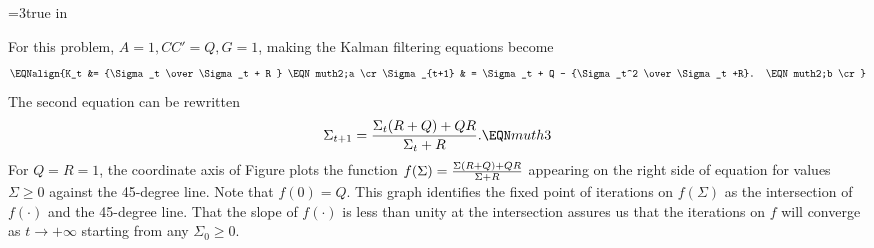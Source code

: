 
\centerline{\epsfxsize=3true in}
\caption{Graph of $f(\Sigma) = {
 {\Sigma(R+Q) + Q R} \over \Sigma + R }$, $Q= R=1$, against the 45-degree
line. Iterations on the Riccati equation for $\Sigma_t$ converge
to the fixed point.}
\endfigure





  For this problem,  $A=1, CC'=Q, G=1$, making the Kalman filtering
 equations  become
$$\EQNalign{K_t &= {\Sigma_t   \over \Sigma_t + R } \EQN muth2;a \cr
            \Sigma_{t+1} & = \Sigma_t + Q - {\Sigma_t^2 \over
                            \Sigma_t +R}. \EQN muth2;b \cr }$$
The second equation can be rewritten
$$ \Sigma_{t+1} = { \Sigma_t(R+Q) + Q R \over \Sigma_t + R }. \EQN muth3$$
For $Q=R=1$, the coordinate axis of Figure  plots the function
$f(\Sigma)
 = {\Sigma(R+Q) + Q R \over \Sigma + R }$ appearing on the right side
of equation  for values $\Sigma \geq 0$ against the
45-degree line. Note that $f(0) = Q$.
This graph identifies the fixed point of iterations on
$f(\Sigma)$ as the intersection of $f(\cdot)$ and the 45-degree line.
That the slope of $f(\cdot)$ is less than unity at the intersection
assures us that the iterations on $f$ will converge as $t \rightarrow
+\infty$ starting from any $\Sigma_0 \geq 0$.
%

